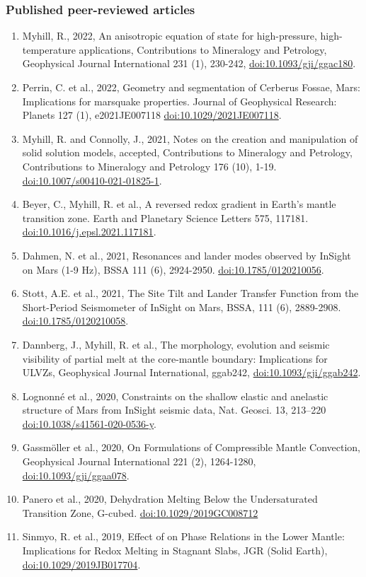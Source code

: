 \documentclass[11pt,twoside,a4paper]{article}
\newcommand{\doi}[1]{\href{http://dx.doi.org/#1}{doi:#1}}
\begin{document}
\subsubsection*{Published peer-reviewed articles}
\begin{enumerate}
\item Myhill, R., 2022, An anisotropic equation of state for high-pressure, high-temperature applications, Contributions to Mineralogy and Petrology, Geophysical Journal International 231 (1), 230-242, \doi{10.1093/gji/ggac180}.
\item Perrin, C. et al., 2022, Geometry and segmentation of Cerberus Fossae, Mars: Implications for marsquake properties. Journal of Geophysical Research: Planets 127 (1), e2021JE007118 \doi{10.1029/2021JE007118}.
\item Myhill, R. and Connolly, J., 2021, Notes on the creation and manipulation of solid solution models, accepted, Contributions to Mineralogy and Petrology, Contributions to Mineralogy and Petrology 176 (10), 1-19. \doi{10.1007/s00410-021-01825-1}.
\item Beyer, C., Myhill, R. et al., A reversed redox gradient in Earth's mantle transition zone. Earth and Planetary Science Letters 575, 117181. \doi{10.1016/j.epsl.2021.117181}.
\item Dahmen, N. et al., 2021, Resonances and lander modes observed by InSight on Mars (1-9 Hz), BSSA 111 (6), 2924-2950. \doi{10.1785/0120210056}.
\item Stott, A.E. et al., 2021, The Site Tilt and Lander Transfer Function from the Short-Period Seismometer of InSight on Mars, BSSA, 111 (6), 2889-2908. \doi{10.1785/0120210058}.
\item Dannberg, J., Myhill, R. et al., The morphology, evolution and seismic visibility of partial melt at the core-mantle boundary: Implications for ULVZs, Geophysical Journal International, ggab242, \doi{10.1093/gji/ggab242}.
\item Lognonn\'e et al., 2020, Constraints on the shallow elastic and anelastic structure of Mars from InSight seismic data, Nat. Geosci. 13, 213--220 \doi{10.1038/s41561-020-0536-y}.
\item Gassm{\"o}ller et al., 2020, On Formulations of Compressible Mantle Convection, Geophysical Journal International 221 (2), 1264-1280, \doi{10.1093/gji/ggaa078}.
\item Panero et al., 2020, Dehydration Melting Below the Undersaturated Transition Zone, G-cubed. \doi{10.1029/2019GC008712}
\item Sinmyo, R. et al., 2019, Effect of  on Phase Relations in the Lower Mantle: Implications for Redox Melting in Stagnant Slabs, JGR (Solid Earth), \doi{10.1029/2019JB017704}.

\end{enumerate}
\end{document}

